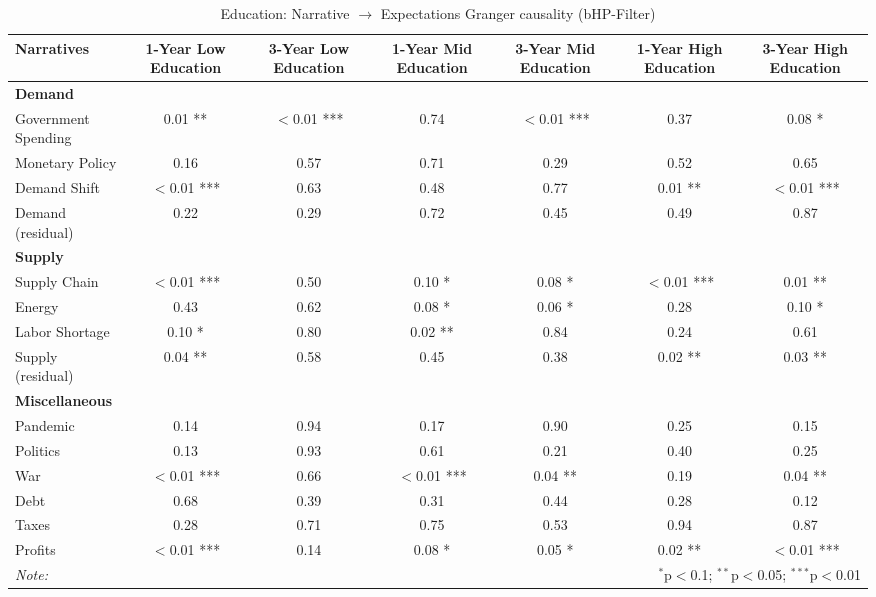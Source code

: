 \begin{sidewaystable}[H]
\centering
\footnotesize
\caption{Education: Narrative $\rightarrow$ Expectations Granger causality (bHP-Filter)}\label{table:granger}

\begin{tabular}{lcccccc}
\toprule
\textbf{Narratives} & \textbf{1-Year Low Education} & \textbf{3-Year Low Education} & \textbf{1-Year Mid Education} & \textbf{3-Year Mid Education} & \textbf{1-Year High Education} & \textbf{3-Year High Education} \\
\midrule
\multicolumn{7}{l}{\textbf{Demand}} \\
\midrule
Government Spending & 0.01 ** & $<$0.01 *** & 0.74 & $<$0.01 *** & 0.37 & 0.08 * \\
Monetary Policy & 0.16 & 0.57 & 0.71 & 0.29 & 0.52 & 0.65 \\
Demand Shift & $<$0.01 *** & 0.63 & 0.48 & 0.77 & 0.01 ** & $<$0.01 *** \\
Demand (residual) & 0.22 & 0.29 & 0.72 & 0.45 & 0.49 & 0.87 \\
\midrule
\multicolumn{7}{l}{\textbf{Supply}} \\
\midrule
Supply Chain & $<$0.01 *** & 0.50 & 0.10 * & 0.08 * & $<$0.01 *** & 0.01 ** \\
Energy & 0.43 & 0.62 & 0.08 * & 0.06 * & 0.28 & 0.10 * \\
Labor Shortage & 0.10 * & 0.80 & 0.02 ** & 0.84 & 0.24 & 0.61 \\
Supply (residual) & 0.04 ** & 0.58 & 0.45 & 0.38 & 0.02 ** & 0.03 ** \\
\midrule
\multicolumn{7}{l}{\textbf{Miscellaneous}} \\
\midrule
Pandemic & 0.14 & 0.94 & 0.17 & 0.90 & 0.25 & 0.15 \\
Politics & 0.13 & 0.93 & 0.61 & 0.21 & 0.40 & 0.25 \\
War & $<$0.01 *** & 0.66 & $<$0.01 *** & 0.04 ** & 0.19 & 0.04 ** \\
Debt & 0.68 & 0.39 & 0.31 & 0.44 & 0.28 & 0.12 \\
Taxes & 0.28 & 0.71 & 0.75 & 0.53 & 0.94 & 0.87 \\
Profits & $<$0.01 *** & 0.14 & 0.08 * & 0.05 * & 0.02 ** & $<$0.01 *** \\
\midrule
\bottomrule
\textit{Note:}  & \multicolumn{6}{r}{$^{*}$p$<$0.1; $^{**}$p$<$0.05; $^{***}$p$<$0.01} \\
\bottomrule
\end{tabular}
\end{sidewaystable}
